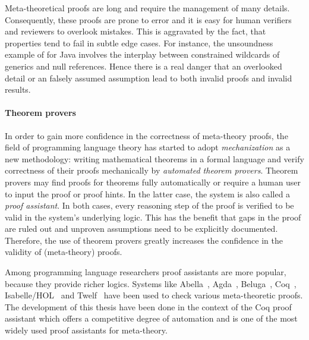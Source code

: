 {Meta-theoretical proofs are long and require the management of many
details. Consequently, these proofs are prone to error and it is easy for human
verifiers and reviewers to overlook mistakes. This is aggravated by the fact,
that properties tend to fail in subtle edge cases. For instance, the unsoundness
example of \cite{amin2016java} for Java involves the interplay between
constrained wildcards of generics and null references. Hence there is a real
danger that an overlooked detail or an falsely assumed assumption lead to both
invalid proofs and invalid results.

\paragraph{Theorem provers}
In order to gain more confidence in the correctness of meta-theory proofs, the
field of programming language theory has started to adopt \emph{mechanization}
as a new methodology: writing mathematical theorems in a formal language and
verify correctness of their proofs mechanically by \emph{automated theorem
  provers}. Theorem provers may find proofs for theorems fully automatically or
require a human user to input the proof or proof hints. In the latter case, the
system is also called a \emph{proof assistant}. In both cases, every reasoning
step of the proof is verified to be valid in the system's underlying logic. This
has the benefit that gaps in the proof are ruled out and unproven assumptions
need to be explicitly documented. Therefore, the use of theorem provers greatly
increases the confidence in the validity of (meta-theory) proofs.


Among programming language researchers proof assistants are more popular,
because they provide richer logics. %
Systems like Abella~\cite{abella}, Agda~\cite{norellthesis},
Beluga~\cite{beluga}, Coq~\cite{coq}, Isabelle/HOL~\cite{isabelle} and
Twelf~\cite{twelf} have been used to check various meta-theoretic proofs. The
development of this thesis have been done in the context of the Coq proof
assistant which offers a competitive degree of automation and is one of the most
widely used proof assistants for meta-theory.

}
